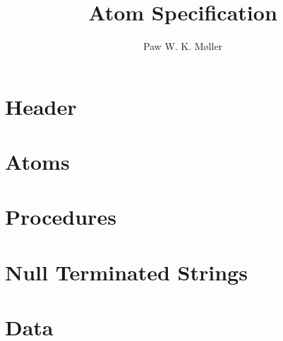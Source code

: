 \documentclass[10pt, a4paper]{article}
\title{Atom Specification}
\author{Paw W. K. Møller}
\begin{document}
    \maketitle
    \clearpage
    
    \tableofcontents
    \clearpage
    
    \setcounter{page}{1}
    \setlength{\parskip}{10pt}

    \maketitle
    
    \section{Header}
    
    
    \section{Atoms}
    
    
    \section{Procedures}
    
    
    \section{Null Terminated Strings}
    
    
    \section{Data}
    
\end{document}

